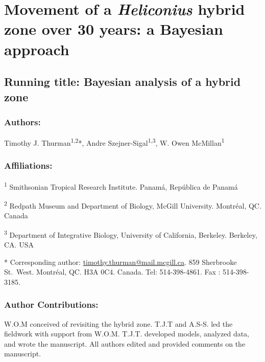 \documentclass[]{article}
\title{}
\author{}
\date{}
\begin{document}
\section{\texorpdfstring{Movement of a \textit{Heliconius} hybrid zone
over 30 years: a Bayesian
approach}{Movement of a  hybrid zone over 30 years: a Bayesian approach}}\label{movement-of-a-hybrid-zone-over-30-years-a-bayesian-approach}

\subsection{Running title: Bayesian analysis of a hybrid
zone}\label{running-title-bayesian-analysis-of-a-hybrid-zone}

\subsubsection{Authors:}\label{authors}

Timothy J. Thurman\textsuperscript{1,2}*, Andre
Szejner-Sigal\textsuperscript{1,3}, W. Owen McMillan\textsuperscript{1}

\subsubsection{Affiliations:}\label{affiliations}

\textsuperscript{1} Smithsonian Tropical Research Institute. Panamá,
República de Panamá

\textsuperscript{2} Redpath Museum and Department of Biology, McGill
University. Montréal, QC. Canada

\textsuperscript{3} Department of Integrative Biology, University of
California, Berkeley. Berkeley, CA. USA

* Corresponding author:
\href{mailto:timothy.thurman@mail.mcgill.ca}{timothy.thurman@mail.mcgill.ca}.
859 Sherbrooke St.~West. Montréal, QC. H3A 0C4. Canada. Tel:
514-398-4861. Fax : 514-398-3185.

\subsubsection{Author Contributions:}\label{author-contributions}

W.O.M conceived of revisiting the hybrid zone. T.J.T and A.S-S. led the
fieldwork with support from W.O.M. T.J.T. developed models, analyzed
data, and wrote the manuscript. All authors edited and provided comments
on the manuscript.
\end{document}
